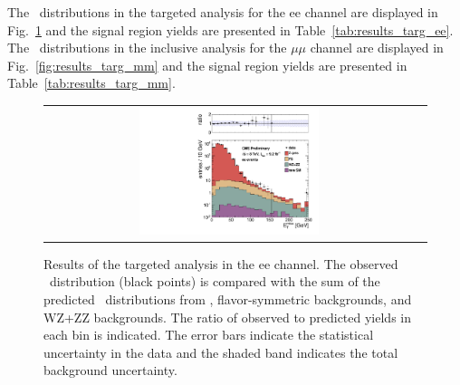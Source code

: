 \clearpage

The \MET\ distributions in the targeted analysis for the ee channel are displayed in Fig.~\ref{fig:results_targ_ee} and 
the signal region yields are presented in Table~\ref{tab:results_targ_ee}.
The \MET\ distributions in the inclusive analysis for the $\mu\mu$ channel are displayed in Fig.~\ref{fig:results_targ_mm} and 
the signal region yields are presented in Table~\ref{tab:results_targ_mm}.

\begin{figure}[!h]
\begin{center}
\begin{tabular}{cc}
\includegraphics[width=0.5\textwidth]{plots/pfmet_bvetoMedium_ee.pdf}
\end{tabular}
\caption{Results of the targeted analysis in the ee channel. The observed \MET\ distribution (black points) is compared with the sum of the predicted \MET\
distributions from \zjets, flavor-symmetric backgrounds, and WZ+ZZ backgrounds. The ratio of observed to predicted yields in each bin is
indicated. The error bars indicate the statistical uncertainty in the data and the shaded band indicates the total background uncertainty.
\label{fig:results_targ_ee}
}
\end{center}
\end{figure}



